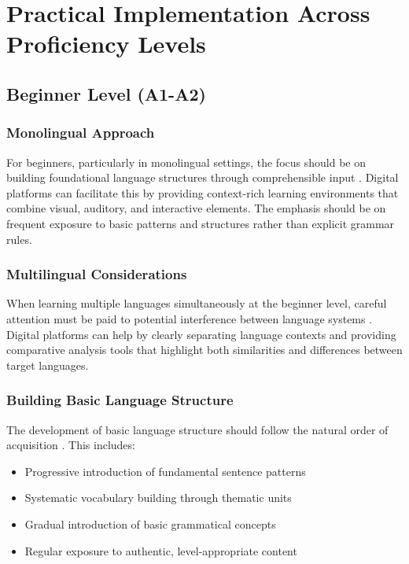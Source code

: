 \section{Practical Implementation Across Proficiency Levels}
\subsection{Beginner Level (A1-A2)}
\subsubsection{Monolingual Approach}
For beginners, particularly in monolingual settings, the focus should be on building foundational language structures through comprehensible input \citep{krashen2013second}. Digital platforms can facilitate this by providing context-rich learning environments that combine visual, auditory, and interactive elements. The emphasis should be on frequent exposure to basic patterns and structures rather than explicit grammar rules.

\subsubsection{Multilingual Considerations}
When learning multiple languages simultaneously at the beginner level, careful attention must be paid to potential interference between language systems \citep{lai2017learning}. Digital platforms can help by clearly separating language contexts and providing comparative analysis tools that highlight both similarities and differences between target languages.

\subsubsection{Building Basic Language Structure}
The development of basic language structure should follow the natural order of acquisition \citep{dulay1974natural}. This includes:
\begin{itemize}
    \item Progressive introduction of fundamental sentence patterns
    \item Systematic vocabulary building through thematic units
    \item Gradual introduction of basic grammatical concepts
    \item Regular exposure to authentic, level-appropriate content
\end{itemize}

